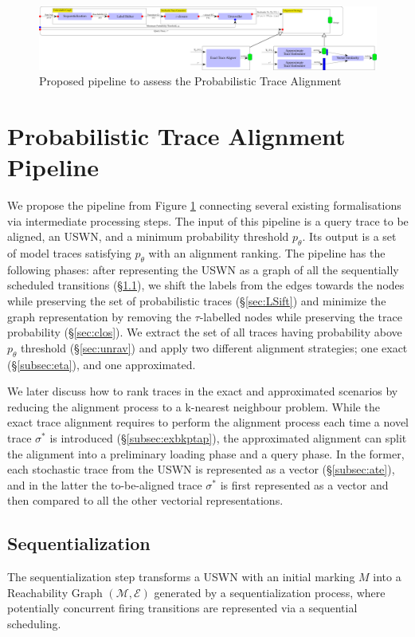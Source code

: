 \begin{figure}[!t]
	\hspace*{-1cm}\includegraphics[width=1.2\textwidth]{images/pipeline}
	\caption{Proposed pipeline to assess the Probabilistic Trace Alignment}\label{fig:pipe}
\end{figure}


\section{Probabilistic Trace Alignment Pipeline}
We propose the pipeline from Figure \ref{fig:pipe} connecting several existing formalisations via intermediate processing steps. 
The input of this pipeline is a query trace to be aligned, an USWN, and a minimum probability threshold $p_\theta$. Its output 
is a set of model traces satisfying $p_\theta$ with an alignment ranking.
%
The pipeline has the following phases: after representing the USWN as a graph of all the sequentially scheduled transitions 
(\S\ref{sec:seqZ}), we shift the labels from the edges towards the nodes while preserving the set of probabilistic traces 
(\S\ref{sec:LSift}) and minimize the graph representation by removing the $\tau$-labelled nodes while preserving the 
trace probability (\S\ref{sec:clos}). We extract the set of all traces having probability above $p_\theta$ threshold (\S\ref{sec:unrav}) and  apply two different alignment strategies; one exact  (\S\ref{subsec:eta}), and one approximated. 


We later discuss how to rank traces in the exact and approximated scenarios by reducing the alignment process to a k-nearest 
neighbour problem. While the exact trace alignment requires to perform the alignment process each time a novel trace $\sigma^*$ is 
introduced (\S\ref{subsec:exbkptap}), the approximated alignment can split the alignment into a preliminary loading phase and a 
query phase. In the former, each stochastic trace from the USWN is represented as a vector (\S\ref{subsec:ate}), and in the latter the to-be-aligned trace $\sigma^*$ is first represented as a vector and then compared to all the other vectorial representations.  

\subsection{Sequentialization}\label{sec:seqZ}
The sequentialization step transforms a USWN with an initial marking $M$ into a Reachability Graph $(\mathcal{M},\mathcal{E})$ 
generated by a sequentialization process, where potentially concurrent firing transitions are represented via a sequential scheduling. 

